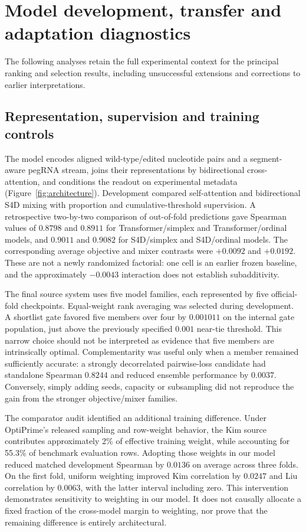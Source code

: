 \section{Model development, transfer and adaptation diagnostics}
The following analyses retain the full experimental context for the principal ranking and selection results, including unsuccessful extensions and corrections to earlier interpretations.
\subsection{Representation, supervision and training controls}
\label{sec:supmodelcontrols}
The model encodes aligned wild-type/edited nucleotide pairs and a segment-aware pegRNA stream, joins their representations by bidirectional cross-attention, and conditions the readout on experimental metadata (Figure~\ref{fig:architecture}). Development compared self-attention and bidirectional S4D mixing with proportion and cumulative-threshold supervision. A retrospective two-by-two comparison of out-of-fold predictions gave Spearman values of $0.8798$ and $0.8911$ for Transformer/simplex and Transformer/ordinal models, and $0.9011$ and $0.9082$ for S4D/simplex and S4D/ordinal models. The corresponding average objective and mixer contrasts were $+0.0092$ and $+0.0192$. These are not a newly randomized factorial: one cell is an earlier frozen baseline, and the approximately $-0.0043$ interaction does not establish subadditivity.

The final source system uses five model families, each represented by five official-fold checkpoints. Equal-weight rank averaging was selected during development. A shortlist gate favored five members over four by $0.001011$ on the internal gate population, just above the previously specified $0.001$ near-tie threshold. This narrow choice should not be interpreted as evidence that five members are intrinsically optimal. Complementarity was useful only when a member remained sufficiently accurate: a strongly decorrelated pairwise-loss candidate had standalone Spearman $0.8244$ and reduced ensemble performance by $0.0037$. Conversely, simply adding seeds, capacity or subsampling did not reproduce the gain from the stronger objective/mixer families.

The comparator audit identified an additional training difference. Under OptiPrime's released sampling and row-weight behavior, the Kim source contributes approximately 2\% of effective training weight, while accounting for 55.3\% of benchmark evaluation rows. Adopting those weights in our model reduced matched development Spearman by $0.0136$ on average across three folds. On the first fold, uniform weighting improved Kim correlation by $0.0247$ and Liu correlation by $0.0063$, with the latter interval including zero. This intervention demonstrates sensitivity to weighting in our model. It does not causally allocate a fixed fraction of the cross-model margin to weighting, nor prove that the remaining difference is entirely architectural.

